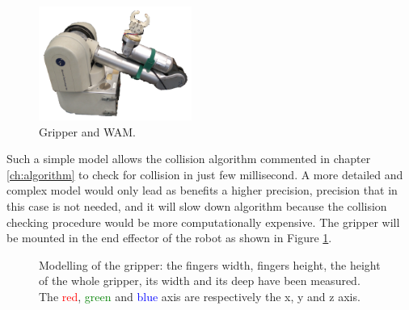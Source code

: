 \begin{figure}
\caption{Gripper and WAM.}\label{fig:wam_gripper}
\includegraphics[width=5.0cm]{Img/set_up/wam_gripper.png}
\end{figure}

Such a simple model allows the collision algorithm commented in chapter \ref{ch:algorithm} to check for collision in just few millisecond. 
A more detailed and complex model would only lead as benefits a higher precision, precision that in this case is not needed, and it will slow down algorithm because the collision checking procedure would be more computationally expensive. 
The gripper will be mounted in the end effector of the robot as shown in Figure \ref{fig:wam_gripper}. 


\begin{figure}[htp]
\centering
\begin{subfigure}[t]{0.25\textwidth}
\centering
{}
\end{subfigure} 
\begin{subfigure}[t]{0.3\textwidth}
\centering
{}
\end{subfigure}
\hspace{1cm}
\begin{subfigure}[t]{0.3\textwidth}
\centering
{}
\end{subfigure}
\caption{Modelling of the gripper: the fingers width, fingers height, the height of the whole gripper, its width and its deep have been measured. The \textcolor{red}{red}, \textcolor{green}{green} and \textcolor{blue}{blue} axis are respectively the x, y and z axis.}\label{fig:gripper_modelling}
\end{figure}

